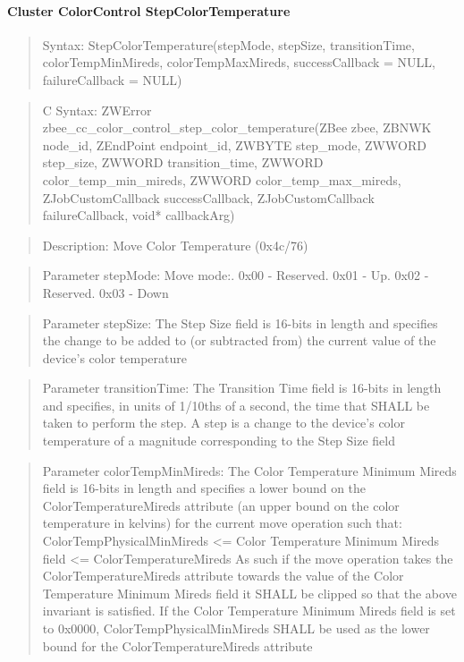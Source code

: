 \paragraph{Cluster ColorControl StepColorTemperature}
\begin{quote}Syntax: StepColorTemperature(stepMode, stepSize, transitionTime, colorTempMinMireds, colorTempMaxMireds, successCallback = NULL, failureCallback = NULL)\end{quote}
\begin{quote}C Syntax: ZWError zbee\_cc\_color\_control\_step\_color\_temperature(ZBee zbee, ZBNWK node\_id, ZEndPoint endpoint\_id, ZWBYTE step\_mode, ZWWORD step\_size, ZWWORD transition\_time, ZWWORD color\_temp\_min\_mireds, ZWWORD color\_temp\_max\_mireds, ZJobCustomCallback successCallback, ZJobCustomCallback failureCallback, void* callbackArg)\end{quote}
\begin{quote}Description: Move Color Temperature (0x4c/76)\end{quote}
\begin{quote}Parameter stepMode: Move mode:. 0x00 - Reserved. 0x01 - Up. 0x02 - Reserved. 0x03 - Down\end{quote}
\begin{quote}Parameter stepSize: The Step Size field is 16-bits in length and specifies the change to be added to (or subtracted from) the current value of the device’s color temperature\end{quote}
\begin{quote}Parameter transitionTime: The Transition Time field is 16-bits in length and specifies, in units of 1/10ths of a second, the time that SHALL be taken to perform the step. A step is a change to the device’s color temperature of a magnitude corresponding to the Step Size field\end{quote}
\begin{quote}Parameter colorTempMinMireds: The Color Temperature Minimum Mireds field is 16-bits in length and specifies a lower bound on the ColorTemperatureMireds attribute (an upper bound on the color temperature in kelvins) for the current move operation such that: ColorTempPhysicalMinMireds <= Color Temperature Minimum Mireds field <= ColorTemperatureMireds As such if the move operation takes the ColorTemperatureMireds attribute towards the value of the Color Temperature Minimum Mireds field it SHALL be clipped so that the above invariant is satisfied. If the Color Temperature Minimum Mireds field is set to 0x0000, ColorTempPhysicalMinMireds SHALL be used as the lower bound for the ColorTemperatureMireds attribute\end{quote}
